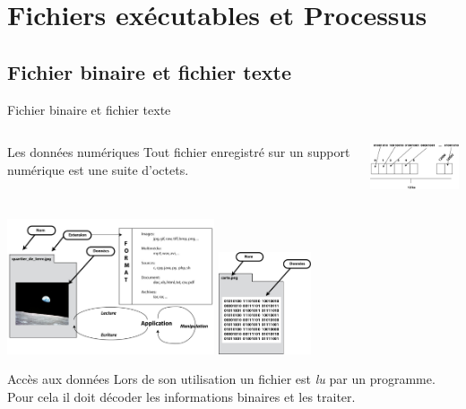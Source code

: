 \section{Fichiers exécutables et Processus}
\subsection{Fichier binaire et fichier texte}
\begin{frame}{Fichier binaire et fichier texte}
  \begin{columns}
    \begin{column}{5cm}
      \begin{block}{Les données numériques}
        Tout fichier enregistré sur un support numérique est une suite
        d'octets.
      \end{block}
    \end{column}
    \begin{column}{6cm}
      \begin{center}
        \includegraphics[width=4cm]{img/s03/Memoire.jpg}
      \end{center}
    \end{column}
  \end{columns}
  \begin{center}
    \includegraphics[height=4cm]{img/s03/fichier_1_1.jpg}
    \includegraphics[height=3cm]{img/s03/fichier_1.jpg}
  \end{center}
  \begin{block}{Accès aux données}
    Lors de son utilisation un fichier est \textit{lu} par un
    programme. Pour cela il doit décoder les informations binaires et
    les traiter.
  \end{block}
\end{frame}

